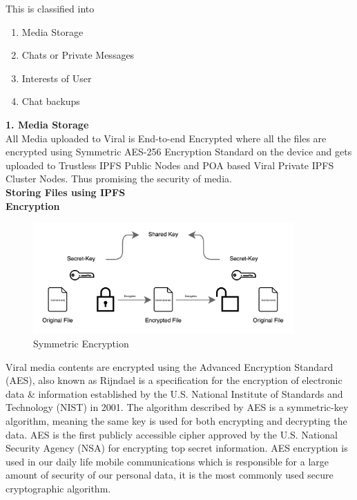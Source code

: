 \documentclass[10pt]{article}
\begin{document}
This is classified into
\begin{enumerate}[leftmargin=+0.2in]
\item Media Storage
\item Chats or Private Messages
\item Interests of User
\item Chat backups
\end{enumerate}

\textbf{1. Media Storage}\\

All Media uploaded to Viral is End-to-end Encrypted where all the files are encrypted using Symmetric AES-256 Encryption Standard on the device and gets uploaded to Trustless IPFS Public Nodes and POA based Viral Private IPFS Cluster Nodes. Thus promising the security of media.\\

\textbf{Storing Files using IPFS}\\





\textbf{Encryption}\\

\begin{figure}[H]
\begin{center}
\includegraphics[width=10cm]{aes}
\caption{Symmetric Encryption}
\end{center}
\end{figure}

Viral media contents are encrypted using the Advanced Encryption Standard (AES), also known as Rijndael is a specification for the encryption of electronic data \& information established by the U.S. National Institute of Standards and Technology (NIST) in 2001. The algorithm described by AES is a symmetric-key algorithm, meaning the same key is used for both encrypting and decrypting the data. AES is the first publicly accessible cipher approved by the U.S. National Security Agency (NSA) for encrypting top secret information. AES encryption is used in our daily life mobile communications which is responsible for a large amount of security of our personal data, it is the most commonly used secure cryptographic algorithm.\\
\end{document}
